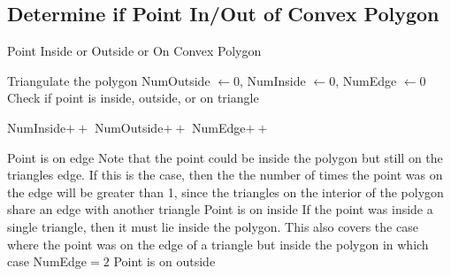 \documentclass[a4paper,10pt]{scrartcl}
\begin{document}
\newpage
\subsection{Determine if Point In/Out of Convex Polygon}


\begin{algorithm}[!h]
  \caption{Point Inside or Outside or On Convex Polygon}\label{}
  \begin{algorithmic}
    \State Triangulate the polygon
    \State NumOutside $\gets 0$, NumInside $\gets 0$, NumEdge $\gets 0$
      \State Check if point is inside, outside, or on triangle
      
	\State NumInside$++$
	\State NumOutside$++$
      \Else
	\State NumEdge$++$
      \EndIf
    \EndFor
    
      \State Point is on edge 
      \Comment Note that the point could be inside the polygon but still on the triangles edge. If this is the case,
      then the the number of times the point was on the edge will be greater than 1, since the triangles on the interior of
      the polygon share an edge with another triangle
      \State Point is on inside
      \Comment If the point was inside a single triangle, then it must lie inside the polygon. This also
      covers the case where the point was on the edge of a triangle but inside the polygon in which case NumEdge$ = 2  $
    \Else
      \State Point is on outside
    \EndIf
  \end{algorithmic}
\end{algorithm}
\end{document}
